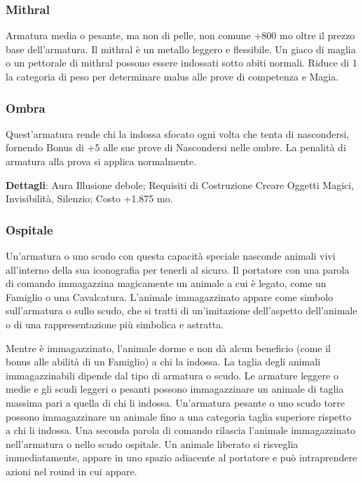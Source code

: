\begin{multicols}{2}
	\subsubsection*{Mithral}

	Armatura media o pesante, ma non di pelle, non comune +800 mo oltre il prezzo base dell'armatura. Il mithral è un metallo leggero e flessibile. Un giaco di maglia o un pettorale di mithral possono essere indossati sotto abiti normali. Riduce di 1 la categoria di peso per determinare malus alle prove di competenza e Magia.

	\subsubsection*{Ombra}

	Quest'armatura rende chi la indossa sfocato ogni volta che tenta di nascondersi, fornendo Bonus di +5 alle sue prove di Nascondersi nelle ombre. La penalità di armatura alla prova si applica normalmente.

	\textbf{Dettagli}: Aura Illusione debole; Requisiti di Costruzione Creare Oggetti Magici, Invisibilità, Silenzio; Costo +1.875 mo.

	\subsubsection*{Ospitale}

	Un'armatura o uno scudo con questa capacità speciale nasconde animali vivi all'interno della sua iconografia per tenerli al sicuro. Il portatore con una parola di comando immagazzina magicamente un animale a cui è legato, come un Famiglio o una Cavalcatura. L'animale immagazzinato appare come simbolo sull'armatura o sullo scudo, che si tratti di un'imitazione dell'aspetto dell'animale o di una rappresentazione più simbolica e astratta.

	Mentre è immagazzinato, l'animale dorme e non dà alcun beneficio (come il bonus alle abilità di un Famiglio) a chi la indossa. La taglia degli animali immagazzinabili dipende dal tipo di armatura o scudo. Le armature leggere o medie e gli scudi leggeri o pesanti possono immagazzinare un animale di taglia massima pari a quella di chi li indossa. Un'armatura pesante o uno scudo torre possono immagazzinare un animale fino a una categoria taglia superiore rispetto a chi li indossa. Una seconda parola di comando rilascia l'animale immagazzinato nell'armatura o nello scudo ospitale. Un animale liberato si risveglia immediatamente, appare in uno spazio adiacente al portatore e può intraprendere azioni nel round in cui appare.


\end{multicols}
